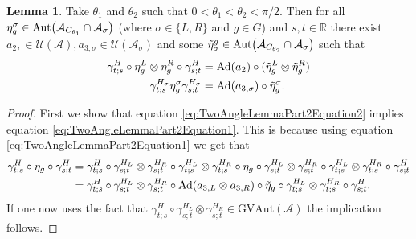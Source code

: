 \documentclass[12pt,a4paper,twoside]{article}
\let\originalleft\left
\let\originalright\right
\renewcommand{\left}{\mathopen{}\mathclose\bgroup\originalleft}
\renewcommand{\right}{\aftergroup\egroup\originalright}
\newcommand{\UU}{\mathcal U}
\renewcommand{\AA}{\mathcal A}
\newcommand{\RR}{\mathbb R}
\newcommand{\Ad}[1]{\textrm{Ad}\left(#1\right)}
\newcommand{\Aut}[1]{\textrm{Aut}\left(#1\right)}
\theoremstyle{definition}
\newtheorem{lemma}[theorem]{Lemma}
\numberwithin{equation}{section}
\begin{document}
\begin{lemma}\label{lem:TwoAngleLemmaPart2}
	Take $\theta_1$ and $\theta_2$ such that $0<\theta_1<\theta_2<\pi/2$. Then for all $\eta_{g}^{\sigma}\in\Aut{\AA_{C_{\theta_1}}\cap\AA_{\sigma}}$ (where $\sigma\in\{L,R\}$ and $g\in G$) and $s,t\in\RR$ there exist $a_{2},\in\UU(\AA),a_{3,\sigma}\in\UU(\AA_\sigma)$ and some $\tilde{\eta}_{\sigma}^g\in \Aut{\AA_{C_{\theta_2}}\cap\AA_{\sigma}}$ such that
	\begin{align}
		\label{eq:TwoAngleLemmaPart2Equation1}
		\gamma^{H}_{t;s}\circ\eta_{g}^L\otimes\eta_{g}^R\circ\gamma^{H}_{s;t}&=\Ad{a_2}\circ(\tilde\eta_{g}^L \otimes\tilde\eta_{g}^R)\\
		\label{eq:TwoAngleLemmaPart2Equation2}
		\gamma^{H_\sigma}_{t;s}\eta_g^\sigma\gamma^{H_\sigma}_{s;t}&=\Ad{a_{3,\sigma}}\circ \tilde\eta_{g}^\sigma.
	\end{align}
\end{lemma}
\begin{proof}
	First we show that equation \eqref{eq:TwoAngleLemmaPart2Equation2} implies equation \eqref{eq:TwoAngleLemmaPart2Equation1}. This is because using equation \eqref{eq:TwoAngleLemmaPart2Equation1} we get that
	\begin{align}
		\gamma^H_{t;s}\circ\eta_g\circ\gamma^{H}_{s;t}&=\gamma^H_{t;s}\circ\gamma^{H_L}_{s;t}\otimes\gamma^{H_R}_{s;t}\circ\gamma^{H_L}_{t;s}\otimes\gamma^{H_R}_{t;s}\circ\eta_g\circ\gamma^{H_L}_{s;t}\otimes\gamma^{H_R}_{s;t}\circ\gamma^{H_L}_{t;s}\otimes\gamma^{H_R}_{t;s}\circ\gamma^H_{s;t}\\
		&=\gamma^H_{t;s}\circ\gamma^{H_L}_{s;t}\otimes\gamma^{H_R}_{s;t}\circ\Ad{a_{3,L}\otimes a_{3,R}}\circ\tilde{\eta}_g\circ\gamma^{H_L}_{t;s}\otimes\gamma^{H_R}_{t;s}\circ\gamma^H_{s;t}.
	\end{align}
	If one now uses the fact that $\gamma^H_{t;s}\circ\gamma^{H_L}_{s;t}\otimes\gamma^{H_R}_{s;t}\in\textrm{GVAut}(\AA)$ the implication follows.
\end{proof}


\end{document}
